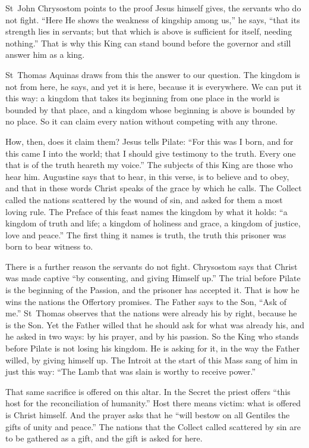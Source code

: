 St~John Chrysostom points to the proof Jesus himself gives, the servants who
do not fight. ``Here He shows the weakness of kingship among us,'' he says,
``that its strength lies in servants; but that which is above is sufficient
for itself, needing nothing.'' That is why this King can stand bound before
the governor and still answer him as a king.

St~Thomas Aquinas draws from this the answer to our question. The kingdom is
not from here, he says, and yet it is here, because it is everywhere. We
can put it this way: a kingdom that takes its beginning from one place in the world is
bounded by that place, and a kingdom whose beginning is above is bounded by no
place. So it can claim every nation without competing with any throne.

\medskip

How, then, does it claim them? Jesus tells Pilate: ``For this was I born, and
for this came I into the world; that I should give testimony to the truth.
Every one that is of the truth heareth my voice.'' The subjects of this King
are those who hear him. Augustine says that to hear, in this verse, is to
believe and to obey, and that in these words Christ speaks of the grace by
which he calls. The Collect called the nations scattered by the wound of
sin, and asked for them a most loving rule. The Preface of this
feast names the kingdom by what it holds: ``a kingdom of truth and life; a
kingdom of holiness and grace, a kingdom of justice, love and peace.'' The
first thing it names is truth, the truth this prisoner was born to bear
witness to.

\medskip

There is a further reason the servants do not fight. Chrysostom says that
Christ was made captive ``by consenting, and giving Himself up.'' The trial
before Pilate is the beginning of the Passion, and the prisoner has accepted
it. That is how he wins the nations the Offertory promises. The Father says to
the Son, ``Ask of me.'' St~Thomas observes that the nations were already his
by right, because he is the Son. Yet the Father willed that he should ask for
what was already his, and he asked in two ways: by his prayer, and by his
passion. So the King who stands before Pilate is not losing his kingdom. He is
asking for it, in the way the Father willed, by giving himself up. The Introit
at the start of this Mass sang of him in just this way: ``The Lamb that was
slain is worthy to receive power.''

That same sacrifice is offered on this altar. In the Secret the priest offers
``this host for the reconciliation of humanity.'' Host there means victim:
what is offered is Christ himself. And the prayer asks that he ``will bestow
on all Gentiles the gifts of unity and peace.'' The nations that the Collect
called scattered by sin are to be gathered as a gift, and the gift is asked
for here.

